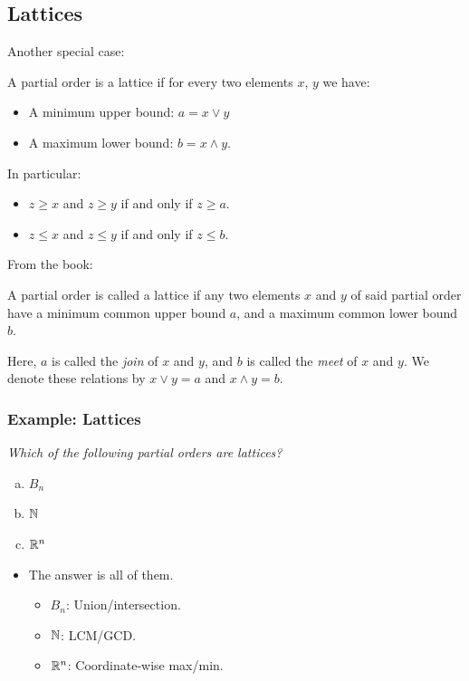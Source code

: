\documentclass[letterpaper]{article}
\begin{document}
\subsection{Lattices}
Another special case:
\begin{definition}{}{}
    A partial order is a lattice if for every two elements $x$, $y$ we have:
    \begin{itemize}
        \item A minimum upper bound: $a = x \vee y$
        \item A maximum lower bound: $b = x \wedge y$.
    \end{itemize}
    In particular:
    \begin{itemize}
        \item $z \geq x$ and $z \geq y$ if and only if $z \geq a$. 
        \item $z \leq x$ and $z \leq y$ if and only if $z \leq b$. 
    \end{itemize}
\end{definition}

From the book:
\begin{definition}{}{}
    A partial order is called a lattice if any two elements $x$ and $y$ of said partial order have a minimum common upper bound $a$, and a maximum common lower bound $b$. 
    
    \bigskip 
    
    Here, $a$ is called the \emph{join} of $x$ and $y$, and $b$ is called the \emph{meet} of $x$ and $y$. We denote these relations by $x \vee y = a$ and $x \wedge y = b$. 
\end{definition}

\subsubsection{Example: Lattices}
\emph{Which of the following partial orders are lattices?}
\begin{enumerate}[(a)]
    \item $B_n$
    \item $\mathbb{N}$
    \item $\mathbb{R}^n$
\end{enumerate}

\begin{itemize}
    \item The answer is all of them. 
    \begin{itemize}
        \item $B_n$: Union/intersection. 
        \item $\mathbb{N}$: LCM/GCD. 
        \item $\mathbb{R}^n$: Coordinate-wise max/min. 
    \end{itemize}
\end{itemize}
\end{document}
